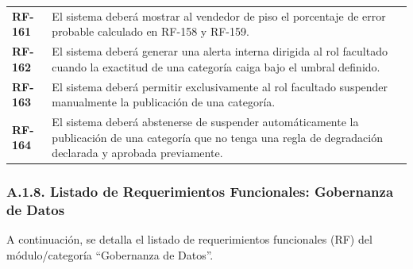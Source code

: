 \documentclass[11pt]{article}
\begin{document}
\begin{longtable}[]{@{}
  >{\raggedright\arraybackslash}p{}
  >{\raggedright\arraybackslash}p{}@{}}
\addlinespace[2pt]
\textbf{RF-161} & El sistema deberá mostrar al vendedor de piso el porcentaje de error probable calculado en RF-158 y RF-159. \\
\addlinespace[2pt]
\textbf{RF-162} & El sistema deberá generar una alerta interna dirigida al rol facultado cuando la exactitud de una categoría caiga bajo el umbral definido. \\
\addlinespace[2pt]
\textbf{RF-163} & El sistema deberá permitir exclusivamente al rol facultado suspender manualmente la publicación de una categoría. \\
\addlinespace[2pt]
\textbf{RF-164} & El sistema deberá abstenerse de suspender automáticamente la publicación de una categoría que no tenga una regla de degradación declarada y aprobada previamente. \\
\end{longtable}

\subsubsection{A.1.8. Listado de Requerimientos Funcionales: Gobernanza de Datos}\label{a-1-8-listado-de-requerimientos-funcionales-gobernanza-de-datos}

A continuación, se detalla el listado de requerimientos funcionales (RF) del módulo/categoría ``Gobernanza de Datos''.
\end{document}
